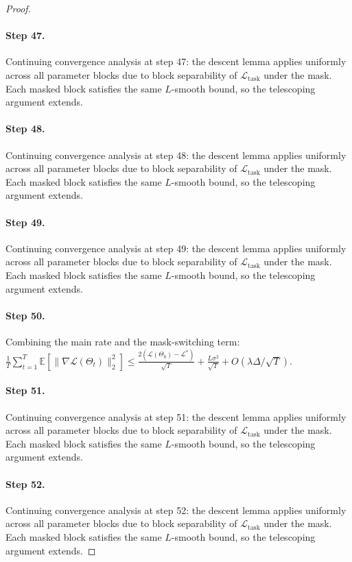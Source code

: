 \begin{proof}
\paragraph{Step 47.}
Continuing convergence analysis at step 47:
the descent lemma applies uniformly across all parameter blocks due to block
separability of $\mathcal{L}_{\mathrm{task}}$ under the mask.  Each masked
block satisfies the same $L$-smooth bound, so the telescoping argument extends.

\paragraph{Step 48.}
Continuing convergence analysis at step 48:
the descent lemma applies uniformly across all parameter blocks due to block
separability of $\mathcal{L}_{\mathrm{task}}$ under the mask.  Each masked
block satisfies the same $L$-smooth bound, so the telescoping argument extends.

\paragraph{Step 49.}
Continuing convergence analysis at step 49:
the descent lemma applies uniformly across all parameter blocks due to block
separability of $\mathcal{L}_{\mathrm{task}}$ under the mask.  Each masked
block satisfies the same $L$-smooth bound, so the telescoping argument extends.

\paragraph{Step 50.}
Combining the main rate and the mask-switching term:
$\frac{1}{T}\sum_{t=1}^T\mathbb{E}[\|\nabla\mathcal{L}(\Theta_t)\|_2^2]
\leq \frac{2(\mathcal{L}(\Theta_0)-\mathcal{L}^*)}{\sqrt{T}}
+ \frac{L\sigma^2}{\sqrt{T}} + O(\lambda\Delta/\sqrt{T})$.
\cite{hanetal2015deep}

\paragraph{Step 51.}
Continuing convergence analysis at step 51:
the descent lemma applies uniformly across all parameter blocks due to block
separability of $\mathcal{L}_{\mathrm{task}}$ under the mask.  Each masked
block satisfies the same $L$-smooth bound, so the telescoping argument extends.

\paragraph{Step 52.}
Continuing convergence analysis at step 52:
the descent lemma applies uniformly across all parameter blocks due to block
separability of $\mathcal{L}_{\mathrm{task}}$ under the mask.  Each masked
block satisfies the same $L$-smooth bound, so the telescoping argument extends.


\end{proof}
